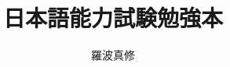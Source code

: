 

\title{日本語能力試験勉強本}
\author{羅波真修}


\pagestyle{empty}

\maketitle

\tableofcontents
\thispagestyle{empty}

\pagestyle{headings}




